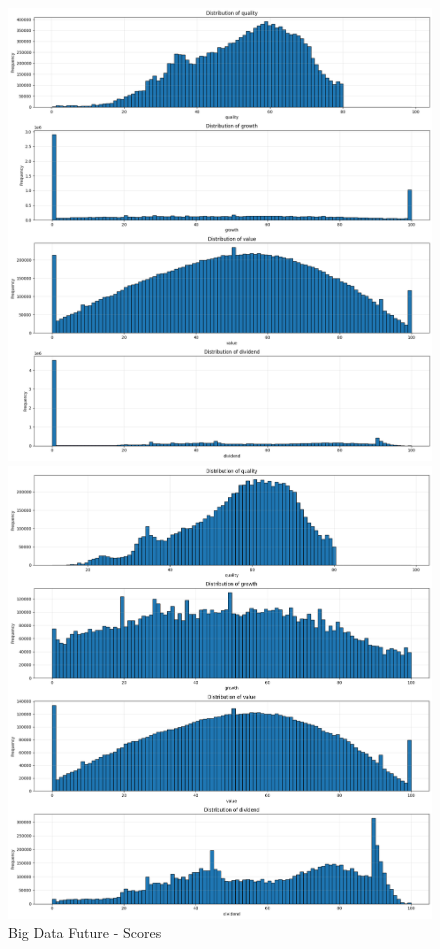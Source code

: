 \documentclass[11pt,english,a4paper,hidelinks]{book}
\begin{document}
\begin{figure}[H]
    \centering
    \begin{minipage}{0.5\textwidth}
        \centering
        \includegraphics[width=\linewidth]{images/code/descriptive analysis/distributions/Big Data future - Scores.png}
        \caption{Big Data Future - Scores}
        \label{fig:scores}
    \end{minipage}\hfill
    \begin{minipage}{0.5\textwidth}
        \centering
        \includegraphics[width=\linewidth]{images/code/descriptive analysis/distributions/Big Data future - Scores Deep.png}

\end{minipage}
\end{figure}
\end{document}
